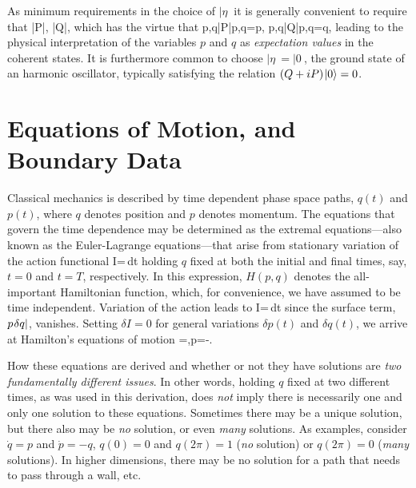 As minimum requirements in the choice of $|\eta\>$ it is generally 
convenient to require that
  \bn  \<\eta|P|\eta{}\;,\hskip1cm \<\eta|Q|\eta{}\;,  \label{h5}\en
which has the virtue that
  \bn  \<p,q|P|p,q\>=p\;,\hskip1cm \<p,q|Q|p,q\>=q\;, \en
leading to the physical interpretation of the variables $p$ and $q$ as 
{\it expectation values} in the coherent states. It is furthermore common 
to choose $|\eta\>=|0\>$, the ground state of an harmonic oscillator, 
typically satisfying the relation $(Q+iP)\hskip.08em|0\rangle=0$. 

\section{Equations of Motion, and Boundary Data}
Classical mechanics is described by time dependent phase space paths, $q(t)$ 
and $p(t)$, where $q$ denotes position and $p$ denotes momentum. The 
equations that govern the time dependence may be determined as the 
extremal equations---also known as the Euler-Lagrange equations---that 
arise from stationary variation of the action functional
  \bn I=\tint[p\s{\dot q}-H(p,q)]\,dt  \en
holding $q$ fixed at both the initial and final times, say, $t=0$ and 
$t=T$, respectively. In this expression, $H(p,q)$ denotes the all-important 
Hamiltonian function, which, for convenience, we have assumed to be time 
independent. Variation of the action leads to
  \bn \delta I=\,dt  \en
since the surface term, $p\hskip.08em\delta q|$, vanishes. Setting $\delta I=0$ 
for general variations $\delta p(t)$ and $\delta q(t)$, we arrive at 
Hamilton's equations of motion
 =\;,\hskip1cm{\dot p}=-\;. \en

How these equations are derived and whether or not they have solutions are 
{\it two fundamentally different issues}. In other words, holding 
$q$ fixed at two different times, as was used in this derivation, does 
{\it not} imply there is necessarily one and only one solution to these 
equations. Sometimes there may be a unique solution, but there also may 
be {\it no} solution, or even {\it many} solutions. As examples, consider 
${\dot q}= p$ and ${\dot p}=-q$, $q(0)=0$ and $q(2\pi)=1$ 
({\it no} solution) or $q(2\pi)=0$ ({\it many} solutions). In higher 
dimensions, there may be no solution for a path that needs to pass through 
a wall, etc. 


